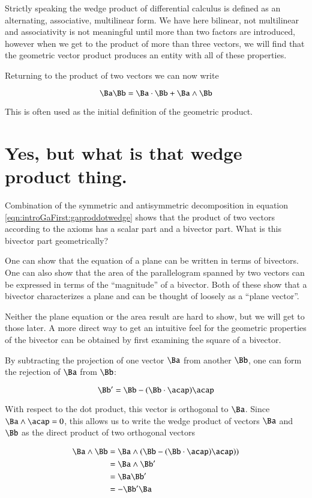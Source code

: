 Strictly speaking the 
wedge product of differential calculus is defined as an alternating, associative, multilinear form.  We have here bilinear, not multilinear and associativity is
not meaningful until more than two factors are introduced, however when we get to the product of more than three
vectors, we will find that the geometric vector product produces an entity with all of these properties.

Returning to the product of two vectors we can now write

\begin{equation}\label{eqn:introGaFirst:gaproddotwedge}
\Ba \Bb = \Ba \cdot \Bb + \Ba \wedge \Bb
\end{equation}

This is often used as the initial definition of the geometric product.

\section{Yes, but what is that wedge product thing. }

Combination of the symmetric and antisymmetric decomposition in equation \ref{eqn:introGaFirst:gaproddotwedge} shows that the product of two vectors according to the axioms
has a scalar part and a bivector part.  What is this bivector part geometrically?

One can show that the equation of a plane can be written in terms of bivectors.  One can also show that
the area of the parallelogram spanned by two vectors can be expressed in terms of the ``magnitude'' of a bivector.  Both of these
show that a bivector characterizes a plane and can be thought of loosely as a ``plane vector''.

Neither the plane equation or the area result are hard to show, but we will get to those later.  A more direct way to get an
intuitive feel for the geometric properties of the bivector can be obtained by first examining the
square of a bivector.

By subtracting the projection of one vector $\Ba$ from another $\Bb$, one can form the rejection of $\Ba$ from $\Bb$:

\[
\Bb' = \Bb - (\Bb \cdot \acap)\acap
\]

With respect to the dot product, this vector is orthogonal to $\Ba$.  Since $\Ba \wedge \acap = 0$, this allows us to 
write the wedge product of vectors $\Ba$ and $\Bb$ as the direct product of two orthogonal vectors

\begin{align*}
\Ba \wedge \Bb 
&= \Ba \wedge (\Bb - (\Bb \cdot \acap)\acap)) \\
&= \Ba \wedge \Bb' \\
&= \Ba \Bb' \\
&= -\Bb' \Ba \\
\end{align*}

